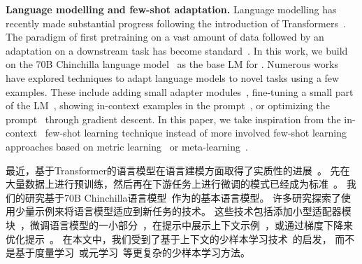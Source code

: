\textbf{Language modelling and few-shot adaptation.}
Language modelling has recently made substantial progress following the introduction of Transformers~\citep{vaswani2017attention}.
The paradigm of first pretraining on a vast amount of data followed by an adaptation on a downstream task has become standard~\citep{mikolov2010recurrent,graves2013generating,jozefowicz2016exploring,howard2018universal,bert,t5,sutskever2011generating,gpt3}.
In this work, we build on the 70B Chinchilla language model~\citep{chinchilla} as the base LM for \largem{}.
Numerous works have explored techniques to adapt language models to novel tasks using a few examples.
These include adding small adapter modules~\citep{houlsby2019parameter}, fine-tuning a small part of the LM~\citep{zaken_bitfit_2022}, showing in-context examples in the prompt~\citep{gpt3}, or optimizing the prompt~\citep{li2021prefix,lester2021power} through gradient descent.
In this paper, we take inspiration from the in-context~\citep{gpt3} few-shot learning technique instead of more involved few-shot learning approaches based on metric learning~\citep{doersch2020crosstransformers,vinyals2016matching,snell2017prototypical,tian2020rethinking} or meta-learning~\citep{finn2017model,bertinetto2018meta,zintgraf2019fast,requeima2019fast,gordon2018meta,bertinetto2016learning}.

最近，基于Transformer的语言模型在语言建模方面取得了实质性的进展~\citep{vaswani2017attention}。 先在大量数据上进行预训练，然后再在下游任务上进行微调的模式已经成为标准~\citep{mikolov2010recurrent,graves2013generating,jozefowicz2016exploring,howard2018universal,bert,t5,sutskever2011generating,gpt3}。 我们的研究基于70B Chinchilla语言模型~\citep{chinchilla}作为\largem{}的基本语言模型。 
许多研究探索了使用少量示例来将语言模型适应到新任务的技术。 这些技术包括添加小型适配器模块~\citep{houlsby2019parameter}，微调语言模型的一小部分~\citep{zaken_bitfit_2022}，在提示中展示上下文示例~\citep{gpt3}，或通过梯度下降来优化提示~\citep{li2021prefix,lester2021power}。 在本文中，我们受到了基于上下文的少样本学习技术~\citep{gpt3}的启发，
而不是基于度量学习~\citep{doersch2020crosstransformers,vinyals2016matching,snell2017prototypical,tian2020rethinking}或元学习~\citep{finn2017model,bertinetto2018meta,zintgraf2019fast,requeima2019fast,gordon2018meta,bertinetto2016learning}等更复杂的少样本学习方法。


